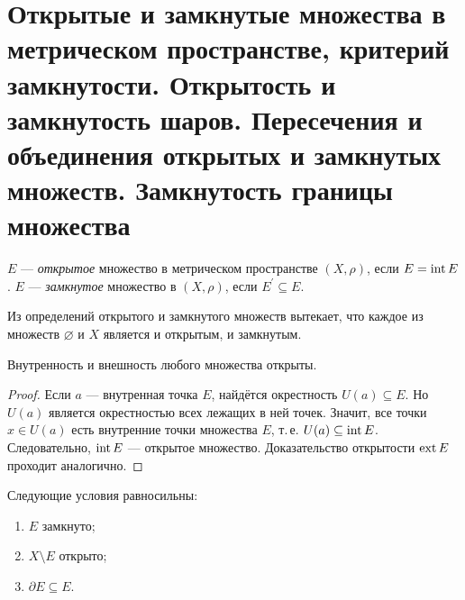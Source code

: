 \section{Открытые и замкнутые множества в метрическом пространстве, критерий замкнутости. Открытость и замкнутость шаров. Пересечения и объединения открытых и замкнутых множеств. Замкнутость границы множества}

\begin{definition}
    $E$ --- \textit{открытое} множество в метрическом пространстве $(X, \rho)$, если $E = \operatorname{int} E$. $E$ --- \textit{замкнутое} множество в $(X, \rho)$, если $E^\prime \subseteq E$.
\end{definition}

Из определений открытого и замкнутого множеств вытекает, что каждое из множеств $\varnothing$ и $X$ является и открытым, и замкнутым.

\begin{proposal}
    Внутренность и внешность любого множества открыты.
\end{proposal}

\begin{proof}
    Если $a$ --- внутренная точка $E$, найдётся окрестность $U(a) \subseteq E$. Но $U(a)$ является окрестностью всех лежащих в ней точек. Значит, все точки $x \in U(a)$ есть внутренние точки множества $E$, т.\,е. $U(a) \subseteq \operatorname{int} E$. Следовательно, $\operatorname{int} E$ --- открытое множество. Доказательство открытости $\operatorname{ext} E$ проходит аналогично.
\end{proof}

\begin{theorem}
    Следующие условия равносильны:
    \begin{enumerate}[nolistsep]
        \item $E$ замкнуто;
        \item $X \setminus E$ открыто;
        \item $\partial E \subseteq E$.
    \end{enumerate}
\end{theorem}


